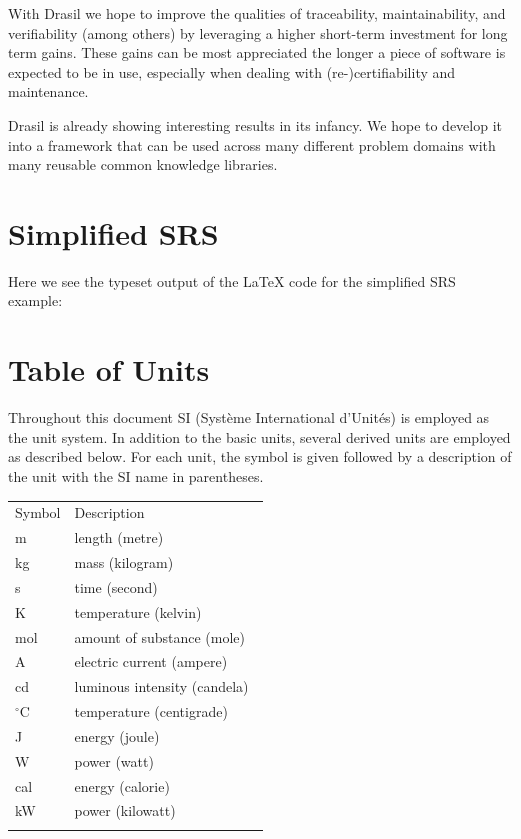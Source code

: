 \documentclass[preprint, 10pt]{sigplanconf}
\begin{document}
With Drasil we hope to improve the qualities of traceability, maintainability,
and verifiability (among others) by leveraging a higher short-term investment
for long term gains. These gains can be most appreciated the longer a piece of
software is expected to be in use, especially when dealing with
(re-)certifiability and maintenance.

Drasil is already showing interesting results in its infancy. We hope to develop
it into a framework that can be used across many different problem domains with
many reusable common knowledge libraries.

\clearpage
\onecolumn
\appendix
\section{Simplified SRS}
\label{appendix:SRS}
Here we see the typeset output of the LaTeX code for the simplified SRS example:

\section*{Table of Units}
\label{Sec:ToU}
Throughout this document SI (Syst\`{e}me International
d'Unit\'{e}s) is employed as the unit system. In addition to
the basic units, several derived units are employed as
described below. For each unit, the symbol is given followed
by a description of the unit with the SI name in
parentheses.
\begin{longtable}{l p{8.5cm}}
Symbol & Description\
\\
m & length (metre)\
\\
kg & mass (kilogram)\
\\
s & time (second)\
\\
K & temperature (kelvin)\
\\
mol & amount of substance (mole)\
\\
A & electric current (ampere)\
\\
cd & luminous intensity (candela)\
\\
${}^{\circ}$C & temperature (centigrade)\
\\
J & energy (joule)\
\\
W & power (watt)\
\\
cal & energy (calorie)\
\\
kW & power (kilowatt)\
\\
\label{Table:ToU}
\end{longtable}
\end{document}
